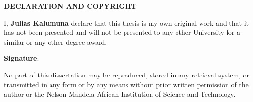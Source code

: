 \begin{center}
{\large \textbf{DECLARATION AND COPYRIGHT}} \\
\vspace{1in}
\end{center}
I, \textbf{Julias Kalumuna} declare that this thesis is my own original work and that it has not been presented and will not be presented to any other University for a similar or any other degree award. \\
\vspace{1.5in}
\begin{center}
\textbf{Signature}: \makebox[2.5in]{\hrulefill}\\
\end{center}
\vspace{1.0in}
No part of this dissertation may be reproduced, stored in any retrieval system, or transmitted in any form or by any means without prior written permission of the author or the Nelson Mandela African Institution of Science and Technology.
\newpage